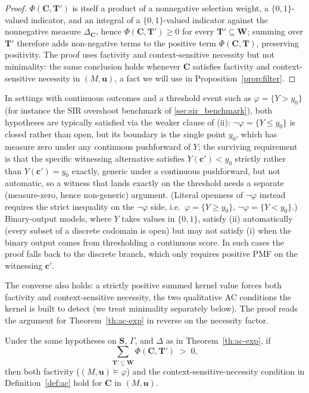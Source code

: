 \begin{proof}
$\Phi(\mathbf{C},\mathbf{T}')$ is itself a product of a nonnegative selection weight,
a $\{0,1\}$-valued indicator, and an integral of a $\{0,1\}$-valued indicator against
the nonnegative measure $\Delta_{\mathbf{C}}$, hence $\Phi(\mathbf{C},\mathbf{T}')\geq
0$ for every $\mathbf{T}'\subseteq\mathbf{W}$; summing over $\mathbf{T}'$ therefore
adds non-negative terms to the positive term $\Phi(\mathbf{C},\mathbf{T})$, preserving
positivity. The proof uses factivity
and context-sensitive necessity but not minimality: the same conclusion holds whenever
$\mathbf{C}$ satisfies factivity and context-sensitive necessity in $(M,\mathbf{u})$,
a fact we will use in Proposition~\ref{prop:filter}.
\end{proof}

\medskip\noindent In settings with continuous outcomes and a threshold event such as
$\varphi=\{Y>y_0\}$ (for instance the SIR overshoot benchmark of
\cref{sec:sir_benchmark}), both hypotheses are typically satisfied via the weaker
clause of (ii): $\neg\varphi=\{Y\le y_0\}$ is closed rather than open, but its
boundary is the single point $y_0$, which has measure zero under any continuous
pushforward of $Y$; the surviving requirement is that the specific witnessing
alternative satisfies $Y(\mathbf{c}')<y_0$ strictly rather than $Y(\mathbf{c}')=y_0$ exactly, generic under a continuous pushforward, but not automatic, so a witness
that lands exactly on the threshold needs a separate (measure-zero, hence
non-generic) argument.
(Literal openness of $\neg\varphi$ instead requires the strict inequality on the
$\neg\varphi$ side, i.e.\ $\varphi=\{Y\ge y_0\}$, $\neg\varphi=\{Y<y_0\}$.)
Binary-output models, where $Y$ takes values in $\{0,1\}$, satisfy
(ii) automatically (every subset of a discrete codomain is open) but may not satisfy
(i) when the binary output comes from thresholding a continuous score. In such cases
the proof falls back to the discrete branch, which only requires positive PMF on the
witnessing $\mathbf{c}'$.

The converse also holds: a strictly positive summed kernel value forces both
factivity and context-sensitive necessity, the two qualitative AC conditions the
kernel is built to detect (we treat minimality separately below). The proof reads
the argument for Theorem~\ref{th:ac-exp} in reverse on the necessity factor.

\begin{theorem}\label{th:exp-ac}
Under the same hypotheses on $\mathbf{S}$, $\Gamma$, and $\Delta$ as
in Theorem~\ref{th:ac-exp}, if
\[
\sum_{\mathbf{T}'\subseteq\mathbf{W}} \Phi(\mathbf{C},\mathbf{T}')\;>\;0,
\]
then both factivity ($(M,\mathbf{u})\vDash\varphi$) and the
context-sensitive-necessity condition in Definition~\ref{def:ac} hold for
$\mathbf{C}$ in $(M,\mathbf{u})$.
\end{theorem}

